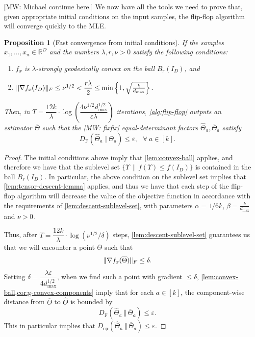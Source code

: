 \documentclass[aos]{imsart}
\newtheorem{prop}[theorem]{Proposition}
\theoremstyle{definition}
\numberwithin{equation}{section}
\DeclarePairedDelimiter{\norm}{\lVert}{\rVert}
\newcommand{\R}{{\mathbb{R}}}
\newcommand{\otheta}{\overline{\Theta}}
\newcommand{\htheta}{\widehat{\Theta}}
\newcommand{\eps}{\varepsilon}
\newcommand{\DF}{D_{\operatorname{F}}}
\newcommand{\Dop}{D_{\operatorname{op}}}
\def\dmax{d_{\max}}
\newcommand{\MW}[1]{{\color{red}[MW: #1]}}
\newcommand{\MW}[1]{{}}
\begin{document}
\MW{Michael continue here.}
We now have all the tools we need to prove that, given appropriate initial conditions on the input samples, the flip-flop algorithm will converge quickly to the MLE.

\begin{prop}[Fast convergence from initial conditions]\label{lem:fast-convergence-initial-generic}
	If the samples $x_1, \ldots, x_n \in \R^D$ and the numbers $\lambda, r, \nu > 0$ satisfy the following conditions:
	\begin{enumerate}
		\item $f_x$ is $\lambda$-strongly geodesically convex on the ball $B_r(I_D)$, and
		\item $\norm{\nabla f_x (I_D)}_F \leq \nu^{1/2} < \dfrac{r \lambda}{2} \leq \min\left\{1, \sqrt{\frac{k}{\dmax}}\right\}.$

	\end{enumerate}
	Then, in $T = \dfrac{12k}{\lambda} \cdot \log\left( \dfrac{4 \nu^{1/2} \dmax^{1/2} }{\eps \lambda} \right)$ iterations, \cref{alg:flip-flop} outputs an estimator $\otheta$ such that the \MW{fixfix} equal-determinant factors $\htheta_a, \otheta_a$ satisfy
	$$ \DF(\htheta_a \ \Vert  \ \otheta_a) \leq \eps, \ \ \ \forall \ a \in [k].$$
\end{prop}

\begin{proof}
	The initial conditions above imply that \cref{lem:convex-ball} applies, and therefore we have that the sublevel set $\{ \Upsilon \ \mid \ f(\Upsilon) \leq f(I_D)  \}$ is contained in the ball $B_r(I_D)$. In particular, the above condition on the sublevel set implies that \cref{lem:tensor-descent-lemma} applies, and thus we have that each step of the flip-flop algorithm will decrease the value of the objective function in accordance with the requirements of \cref{lem:descent-sublevel-set}, with parameters $\alpha = 1/6k$, $\beta = \frac{k}{\dmax}$ and $\nu > 0$.

	Thus, after $T = \dfrac{12k}{\lambda} \cdot \log(\nu^{1/2}/\delta)$ steps, \cref{lem:descent-sublevel-set} guarantees us that we will encounter a point $\otheta$ such that
	$$ \norm{\nabla f_x(\otheta)}_F \leq \delta.$$
	Setting $\delta = \dfrac{\lambda \eps}{4 \dmax^{1/2}}$, when we find such a point with gradient $\leq \delta$, \cref{lem:convex-ball,cor:g-convex-components} imply that for each $a \in [k]$, the component-wise distance from $\otheta$ to $\htheta$ is bounded by
	$$ \DF(\htheta_a \ \Vert  \ \otheta_a) \leq \eps. $$
	This in particular implies that $\Dop(\htheta_a \ \Vert  \ \otheta_a) \leq \eps.$
\end{proof}
\end{document}
